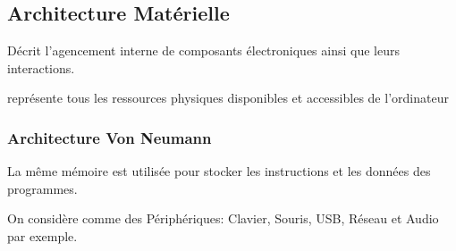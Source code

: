 \documentclass{article}
\begin{document}
\subsection{Architecture Matérielle}
\begin{definition}
    Décrit l'agencement interne de composants électroniques ainsi que leurs interactions.

    \begin{phrase}
        représente tous les ressources physiques disponibles et accessibles de l'ordinateur
    \end{phrase}
\end{definition}
\subsubsection{Architecture Von Neumann}
\begin{definition}
    La même mémoire est utilisée pour stocker les instructions et les données des programmes.

    \begin{figure}[H]
        \centering
    \end{figure}
    On considère comme des Périphériques: Clavier, Souris, USB, Réseau et Audio par exemple. 
\end{definition}
\end{document}
